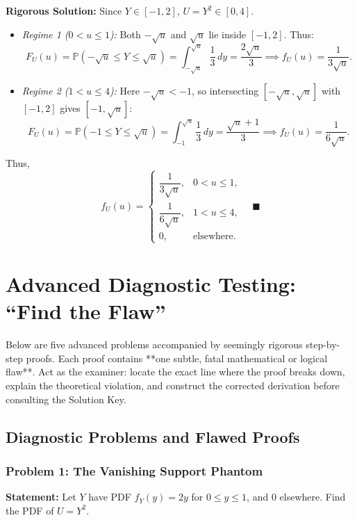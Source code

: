 \documentclass[11pt, letterpaper]{article}
\theoremstyle{definition}
\theoremstyle{remark}
\newcommand{\Prob}{\mathbb{P}}
\begin{document}
\textbf{Rigorous Solution:}
Since $Y \in [-1, 2]$, $U = Y^2 \in [0, 4]$.
\begin{itemize}
    \item \textit{Regime 1 ($0 < u \le 1$):} Both $-\sqrt{u}$ and $\sqrt{u}$ lie inside $[-1, 2]$. Thus:
    \[
        F_U(u) = \Prob(-\sqrt{u} \le Y \le \sqrt{u}) = \int_{-\sqrt{u}}^{\sqrt{u}} \frac{1}{3}\,dy = \frac{2\sqrt{u}}{3} \implies f_U(u) = \frac{1}{3\sqrt{u}}.
    \]
    \item \textit{Regime 2 ($1 < u \le 4$):} Here $-\sqrt{u} < -1$, so intersecting $[-\sqrt{u}, \sqrt{u}]$ with $[-1, 2]$ gives $[-1, \sqrt{u}]$:
    \[
        F_U(u) = \Prob(-1 \le Y \le \sqrt{u}) = \int_{-1}^{\sqrt{u}} \frac{1}{3}\,dy = \frac{\sqrt{u} + 1}{3} \implies f_U(u) = \frac{1}{6\sqrt{u}}.
    \]
\end{itemize}
Thus,
\[
    f_U(u) = \begin{cases} \dfrac{1}{3\sqrt{u}}, & 0 < u \le 1, \\[6pt] \dfrac{1}{6\sqrt{u}}, & 1 < u \le 4, \\[6pt] 0, & \text{elsewhere.} \end{cases} \quad \blacksquare
\]

\newpage
\section{Advanced Diagnostic Testing: ``Find the Flaw''}

Below are five advanced problems accompanied by seemingly rigorous step-by-step proofs. Each proof contains **one subtle, fatal mathematical or logical flaw**. Act as the examiner: locate the exact line where the proof breaks down, explain the theoretical violation, and construct the corrected derivation before consulting the Solution Key.

\subsection{Diagnostic Problems and Flawed Proofs}

\subsubsection*{Problem 1: The Vanishing Support Phantom}
\textbf{Statement:} Let $Y$ have PDF $f_Y(y) = 2y$ for $0 \le y \le 1$, and $0$ elsewhere. Find the PDF of $U = Y^2$.
\end{document}
